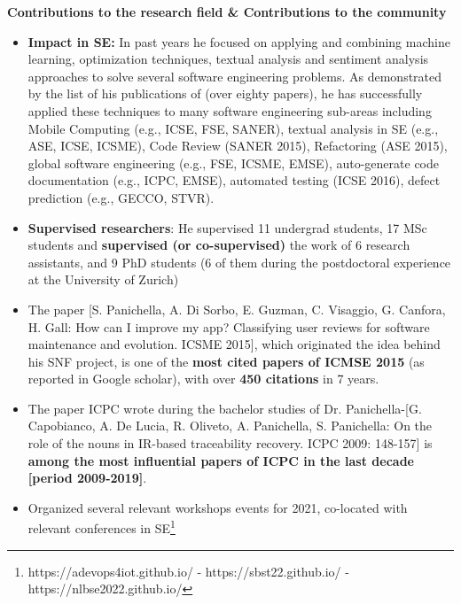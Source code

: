 \documentclass[11pt]{article}
\begin{document}
\textbf{Contributions to the research field \& Contributions to the community}
\vspace{-2.5mm}
\begin{itemize}
\item \textbf{Impact in SE:} In past years he focused on applying and combining machine learning, optimization techniques, textual analysis and sentiment analysis approaches to solve several software engineering problems. As demonstrated by the list of his publications of (over eighty papers), he has successfully applied these techniques to many software engineering sub-areas including Mobile Computing (e.g., ICSE, FSE, SANER), textual analysis in SE (e.g., ASE, ICSE, ICSME), Code Review (SANER 2015), Refactoring (ASE 2015), global software engineering (e.g., FSE, ICSME, EMSE), auto-generate code documentation (e.g., ICPC, EMSE), automated testing (ICSE 2016), defect prediction (e.g., GECCO, STVR). 
  \vspace{-2mm}
  \item 
  \textbf{Supervised researchers}: He supervised 11 undergrad students, 17 MSc students and \textbf{supervised (or co-supervised)} the work of 6 research assistants, and 9 PhD students (6 of them during the postdoctoral experience at the University of Zurich)
  \vspace{-2mm} 
 \item The paper [S. Panichella, A. Di Sorbo, E. Guzman, C. Visaggio, G. Canfora, H. Gall: How can I improve my app? Classifying user reviews for software maintenance and evolution. ICSME 2015], which originated the idea behind his SNF project, is one of the \textbf{most cited papers of ICMSE 2015} (as reported in Google scholar), with over \textbf{450 citations} in 7 years.   
 \vspace{-2mm}
  \item The paper ICPC wrote during the bachelor studies of Dr. Panichella-[G. Capobianco, A. De Lucia, R. Oliveto, A. Panichella, S. Panichella: On the role of the nouns in IR-based traceability recovery. ICPC 2009: 148-157] is \textbf{among the most influential papers of ICPC in the last decade [period 2009-2019]}.
  \vspace{-2mm}
 \item Organized several relevant workshops events for 2021, co-located with relevant conferences in SE\footnote{https://adevops4iot.github.io/
-	https://sbst22.github.io/
-	https://nlbse2022.github.io/}
  \vspace{-2mm}
\end{itemize}
\end{document}
